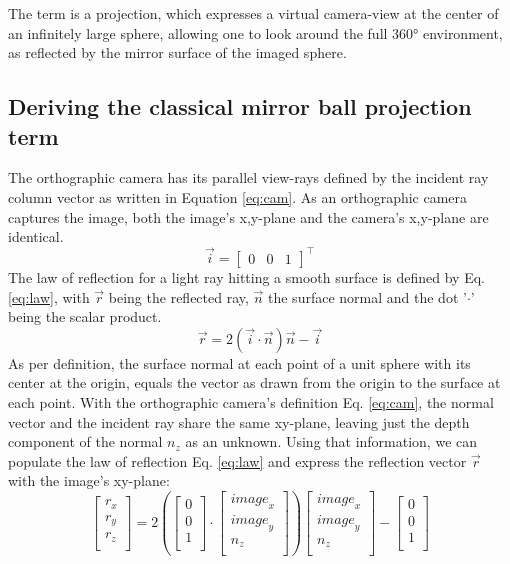 \documentclass[10pt]{article}
\begin{document}
\begin{multicols}{2}
	The term is a projection, which expresses a virtual camera-view at the center of an infinitely large sphere, allowing one to look around the full 360° environment, as reflected by the mirror surface of the imaged sphere.

	\subsection{Deriving the classical mirror ball projection term}

	The orthographic camera has its parallel view-rays defined by the incident ray column vector as written in Equation \ref{eq:cam}. As an orthographic camera captures the image, both the image's x,y-plane and the camera's x,y-plane are identical.
	\begin{equation}\label{eq:cam}
		\vec{i}=\begin{bmatrix}
			0 & 0 & 1
		\end{bmatrix}^\intercal
	\end{equation}
	The law of reflection for a light ray hitting a smooth surface is defined by Eq. \ref{eq:law}, with $\vec{r}$ being the reflected ray, $\vec{n}$ the surface normal and the dot '$\cdot$' being the scalar product.
	\begin{equation}\label{eq:law}
		\vec{r}=2\left(\vec{i}\cdot\vec{n}\right)\vec{n}-\vec{i}
	\end{equation}
	As per definition, the surface normal at each point of a unit sphere with its center at the origin, equals the vector as drawn from the origin to the surface at each point. With the orthographic camera's definition Eq. \ref{eq:cam}, the normal vector and the incident ray share the same xy-plane, leaving just the depth component of the normal $n_z$ as an unknown. Using that information, we can populate the law of reflection Eq. \ref{eq:law} and express the reflection vector $\vec{r}$ with the image's xy-plane:
	\begin{equation}\label{eq:insert}
		\left[\begin{matrix}r_x\\r_y\\r_z\\\end{matrix}\right]=2\left(\left[\begin{matrix}0\\0\\1\\\end{matrix}\right]\cdot\left[\begin{matrix}{image}_x\\{image}_y\\n_z\\\end{matrix}\right]\right)\left[\begin{matrix}{image}_x\\{image}_y\\n_z\\\end{matrix}\right]-\left[\begin{matrix}0\\0\\1\\\end{matrix}\right]

\end{equation}
\end{multicols}
\end{document}
